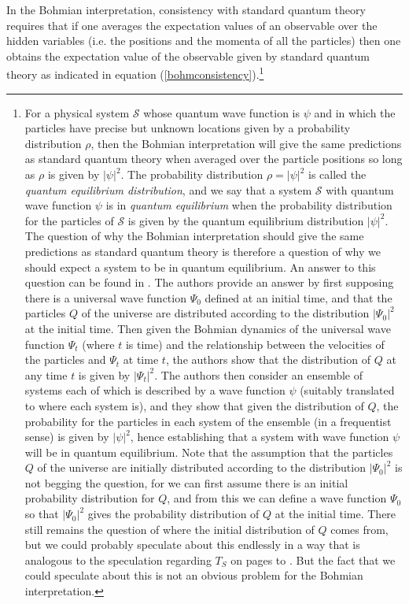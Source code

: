 \documentclass[12pt]{report}
\begin{document}
In the Bohmian interpretation, consistency with standard quantum theory requires that if one averages the expectation values of an observable over the hidden variables (i.e. the positions and the momenta of all the particles) then one obtains the expectation value of the observable given by standard quantum theory as indicated in equation (\ref{bohmconsistency}).\footnote{For a physical system $\mathcal{S}$ whose quantum wave function is $\psi$ and in which the particles have precise but unknown locations given by a probability distribution $\rho$, then the Bohmian interpretation will give the same predictions as standard quantum theory when averaged over the particle positions so long as $\rho$ is given by $|\psi|^2$. The probability distribution $\rho=|\psi|^2$ is called the \emph{quantum equilibrium distribution}, and we say that a system $\mathcal{S}$  with quantum wave function $\psi$ is in \emph{quantum equilibrium} when the probability distribution for the particles of $\mathcal{S}$  is given by the quantum equilibrium distribution $|\psi|^2$. The question of why the Bohmian interpretation should give the same predictions as standard quantum theory is therefore a question of why we should expect a system to be in quantum equilibrium. An answer to this question can be found in \cite[34--51]{DurrDetlef2013Qpwq}. The authors provide an answer by first supposing there is a universal wave function $\Psi_0$ defined at an initial time, and that the particles $Q$ of the universe are distributed according to the distribution $|\Psi_0|^2$ at the initial time. Then given the Bohmian dynamics of the universal wave function $\Psi_t$ (where $t$ is time) and the relationship between the velocities of the particles and $\Psi_t$ at time $t$, the authors show that the distribution of $Q$ at any time $t$ is given by $|\Psi_t|^2$. The authors then consider an ensemble of systems each of which is described by a wave function $\psi$ (suitably translated to where each system is), and they show that given the distribution of $Q$, the probability for the particles in each system of the ensemble (in a frequentist sense) is given by $|\psi|^2$, hence establishing that a system with wave function $\psi$ will be in quantum equilibrium. Note that the assumption that the particles $Q$ of the universe are initially distributed according to the distribution $|\Psi_0|^2$ is not begging the question, for we can first assume there is an initial probability distribution for $Q$, and from this we can define a wave function $\Psi_0$ so that $|\Psi_0|^2$ gives the probability distribution of $Q$ at the initial time. There still remains the question of where the initial distribution of $Q$ comes from, but we could probably speculate about this endlessly in a way that is analogous to the speculation regarding $T_S$ on pages \pageref{selectionmeaningbeg} to \pageref{selectionmeaningend}. But the fact that we could speculate about this is not an obvious problem for the Bohmian interpretation.} 
\end{document}
